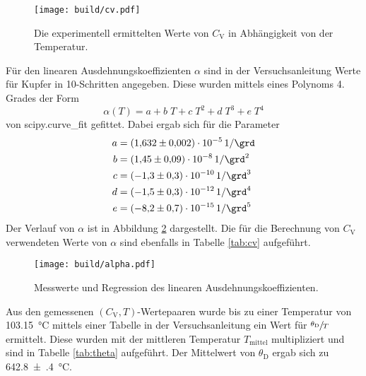 \begin{figure}
  \centering
  \texttt{[image: build/cv.pdf]}      %
    \caption{Die experimentell ermittelten Werte von $C_\text{V}$ in Abhängigkeit
             von der Temperatur.}
  \label{fig:cv}
\end{figure}
\FloatBarrier


\FloatBarrier

Für den linearen Ausdehnungskoeffizienten $\alpha$ sind in der Versuchsanleitung
\cite[p.~5]{anleitung}
Werte für Kupfer in \SI{10}{\grd}-Schritten angegeben. Diese wurden mittels eines Polynoms
4. Grades der Form
\begin{equation*}
    \alpha(T) = a + b\;T + c\;T^2 + d\;T^3 + e\;T^4
\end{equation*}
von scipy.curve\_fit gefittet. Dabei ergab sich für die Parameter
\begin{align*}
    a &= \SI{1.632(2)e-05}{1\per\grd} \\
    b &= \SI{1.45(9)e-08}{1\per\raiseto{2}\grd} \\
    c &= \SI{-1.3(3)e-10}{1\per\raiseto{3}\grd} \\
    d &= \SI{-1.5(3)e-12}{1\per\raiseto{4}\grd} \\
    e &= \SI{-8.2(7)e-15}{1\per\raiseto{5}\grd}
\end{align*}
Der Verlauf von $\alpha$ ist in Abbildung \ref{fig:alpha} dargestellt.
Die für die Berechnung von $C_\text{V}$ verwendeten Werte von $\alpha$ sind ebenfalls
in Tabelle \ref{tab:cv} aufgeführt.

\begin{figure}
  \centering
  \texttt{[image: build/alpha.pdf]}      %
    \caption{Messwerte und Regression des linearen Ausdehnungskoeffizienten.}
  \label{fig:alpha}
\end{figure}
\FloatBarrier

\FloatBarrier
Aus den gemessenen $(C_\text{V}, T)$-Wertepaaren wurde bis zu einer Temperatur von
\SI{103.15}{\celsius} mittels einer Tabelle in der
Versuchsanleitung \cite[p.~5]{anleitung} ein Wert für $\sfrac{\theta_\text{D}}{T}$ ermittelt. Diese wurden
mit der mittleren Temperatur $T_\text{mittel}$ multipliziert und sind
in Tabelle \ref{tab:theta} aufgeführt. Der Mittelwert von $\theta_\text{D}$ ergab sich
zu \SI{642.8(4)}{\celsius}.


